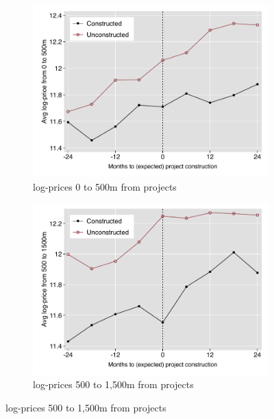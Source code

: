 \documentclass[12pt]{article}
\begin{document}
\begin{figure}[t!]
        \centering
        \caption[ Average house prices before and after expected construction ]
        {\small Average house prices before and after expected construction } 
        \begin{subfigure}[b]{0.495\textwidth}
            \centering
            \includegraphics[width=\textwidth,trim={0.9cm .3cm 0.1cm 0cm}, clip=true]{figures/price_pretrends_close__4}
            \caption[Network2]%
            {{\small log-prices 0 to 500m from projects}}    
            \label{fig:pretrend_close}
        \end{subfigure}
        \hfill
        \begin{subfigure}[b]{0.495\textwidth}   
            \centering 
            \includegraphics[width=\textwidth,trim={0.9cm .3cm 0.1cm 0cm}, clip=true]{figures/price_pretrends_far__4}
            \caption[]%
            {{\small log-prices 500 to 1,500m from projects}}    
            \label{fig:changeprice}
        \end{subfigure}
        \label{fig:pretrend_far}
        \vspace{-6mm}
\end{figure} 
\end{document}

